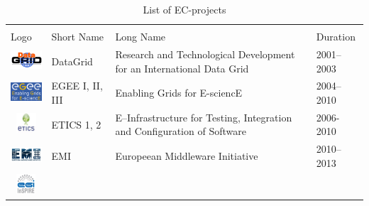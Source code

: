 \documentclass[journal]{IEEEtran}
\begin{document}
\begin{table}[!h]
\renewcommand{\arraystretch}{1.3}
\caption{List of EC-projects}
\label{tab:eup}
\centering
\begin{tabular}{p{1.6cm}p{1.5cm}p{3cm}l}
\hline
\hline
\\
Logo & Short Name & Long Name & Duration\\
\hline
\hline
\begin{minipage}{.3\textwidth}
\includegraphics[width=15mm,height=7.5mm]{images/datagrid}
\end{minipage}
    & DataGrid &
Research and Technological Development for an International Data Grid & 2001--2003\\
\begin{minipage}{.3\textwidth}
\includegraphics[width=15mm,height=7.5mm]{images/egee}
\end{minipage}
     & EGEE I, II, III &
Enabling Grids for E-sciencE & 2004--2010\\
\begin{minipage}{.3\textwidth}
\includegraphics[width=15mm,height=7.5mm]{images/etics}
\end{minipage}
     & ETICS 1, 2 &
E--Infrastructure for Testing, Integration and Configuration of Software & 2006-2010\\
\begin{minipage}{.3\textwidth}
\includegraphics[width=15mm,height=7.5mm]{images/emi}
\end{minipage}
     & EMI &
Europeean Middleware Initiative & 2010--2013\\
\begin{minipage}{.3\textwidth}
\includegraphics[width=15mm,height=7.5mm]{images/egi-inspire}

\end{minipage}
\end{tabular}
\end{table}
\end{document}
